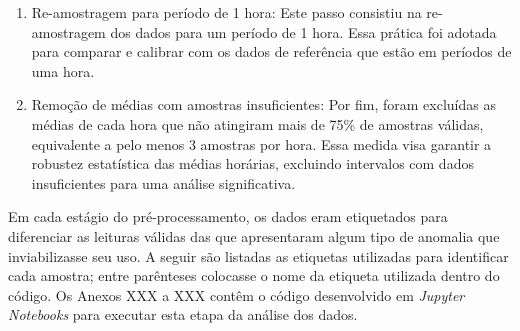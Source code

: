 \begin{enumerate}
    \item Re-amostragem para período de 1 hora: Este passo consistiu na re-amostragem dos dados para um período de 1 hora. Essa prática foi adotada para comparar e calibrar com os dados de referência que estão em períodos de uma hora.
    \item Remoção de médias com amostras insuficientes: Por fim, foram excluídas as médias de cada hora que não atingiram mais de 75\% de amostras válidas, equivalente a pelo menos 3 amostras por hora. Essa medida visa garantir a robustez estatística das médias horárias, excluindo intervalos com dados insuficientes para uma análise significativa.
\end{enumerate}

Em cada estágio do pré-processamento, os dados eram etiquetados para diferenciar as leituras válidas das que apresentaram algum tipo de anomalia que inviabilizasse seu uso. A seguir são listadas as etiquetas utilizadas para identificar cada amostra; entre parênteses colocasse o nome da etiqueta utilizada dentro do código. Os Anexos XXX a XXX contêm o código desenvolvido em \textit{Jupyter Notebooks} para executar esta etapa da análise dos dados.


